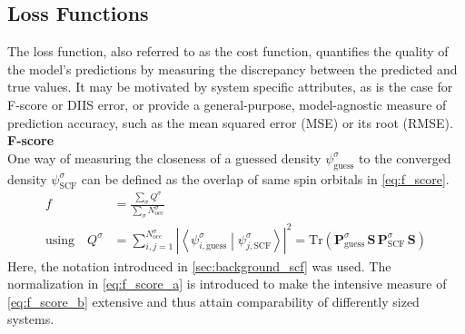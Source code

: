 \subsection{Loss Functions}
\label{subsec:background_loss_function}
The loss function, also referred to as the cost function, quantifies the quality of the model's predictions by measuring the discrepancy between the predicted and true values. It may be motivated by system specific attributes, as is the case for F-score or DIIS error, or provide a general-purpose, model-agnostic measure of prediction accuracy, such as the mean squared error (MSE) or its root (RMSE). \\

\textbf{F-score}\\
One way of measuring the closeness of a guessed density $\psi^\sigma_{\text{guess}}$ to the converged density $\psi^\sigma_{\text{SCF}}$ can be defined as the overlap of same spin orbitals in \autoref{eq:f_score}.
\begin{subequations}
\label{eq:f_score}
\begin{align}
    f &= \frac{\sum\limits_\sigma Q^\sigma}{\sum\limits_\sigma N^\sigma_\text{occ}} \label{eq:f_score_a}\\
    \text{using} \quad Q^\sigma &= \sum_{i,j=1}^{N^\sigma_\text{occ}} \left| \left\langle \psi^\sigma_{i,\text{guess}} \middle| \psi^\sigma_{j,\text{SCF}} \right\rangle \right|^2 = \mathrm{Tr}\left( \mathbf{P}^{\sigma}_\text{guess} \, \mathbf{S} \, \mathbf{P}^{\sigma}_\text{SCF} \, \mathbf{S} \right)  \label{eq:f_score_b}
\end{align}
\end{subequations}
Here, the notation introduced in \autoref{sec:background_scf} was used. The normalization in \autoref{eq:f_score_a} is introduced to make the intensive measure of \autoref{eq:f_score_b} extensive and thus attain comparability of differently sized systems.


